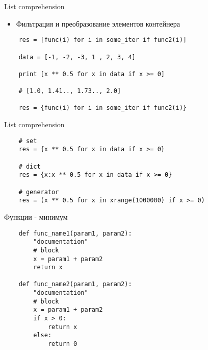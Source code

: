 \documentclass{article}
\begin{document}
\begin{center} List comprehension \end{center}
\vspace{15pt}
\begin{itemize}
	\item Фильтрация и преобразование элементов контейнера
\end{itemize}
\begin{lstlisting}
	res = [func(i) for i in some_iter if func2(i)]

	data = [-1, -2, -3, 1 , 2, 3, 4]

	print [x ** 0.5 for x in data if x >= 0]

	# [1.0, 1.41.., 1.73.., 2.0]

	res = {func(i) for i in some_iter if func2(i)}
\end{lstlisting}
\newpage

\begin{center} List comprehension \end{center}
\begin{lstlisting}
	# set 
	res = {x ** 0.5 for x in data if x >= 0}

	# dict
	res = {x:x ** 0.5 for x in data if x >= 0}

	# generator
	res = (x ** 0.5 for x in xrange(1000000) if x >= 0)
\end{lstlisting}
\newpage

\begin{center} Функции - минимум \end{center}
\begin{lstlisting}
	def func_name1(param1, param2):
		"documentation"
		# block
		x = param1 + param2
		return x

	def func_name2(param1, param2):
		"documentation"
		# block
		x = param1 + param2
		if x > 0:
			return x
		else:
			return 0
\end{lstlisting}
\newpage
\end{document}
